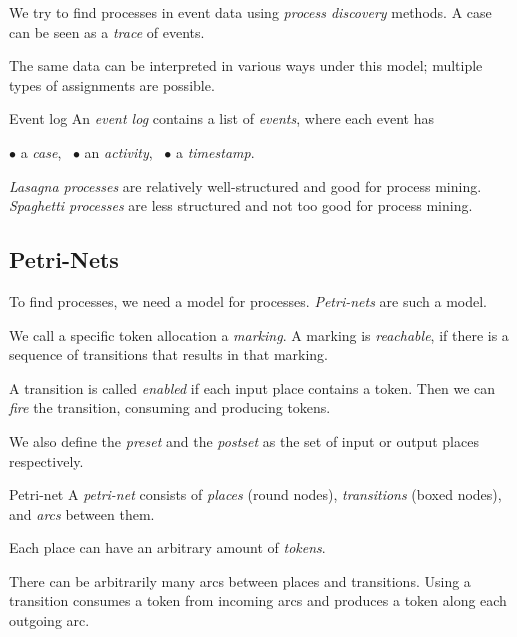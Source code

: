 \documentclass[english]{panikzettel}
\begin{document}
\begin{halfboxl}
We try to find processes in event data using \emph{process discovery} methods.
A case can be seen as a \emph{trace} of events.

The same data can be interpreted in various ways under this model; multiple types of assignments are possible.
\end{halfboxl}%
\begin{halfboxr}
\vspace{-\baselineskip}
\begin{defi}{Event log}
An \emph{event log} contains a list of \emph{events}, where each event has
\begin{tightcenter}
$\bullet$ a \emph{case},~ $\bullet$ an \emph{activity},~ $\bullet$ a \emph{timestamp}.
\end{tightcenter}
\end{defi}
\end{halfboxr}

\emph{Lasagna processes} are relatively well-structured and good for process mining.
\emph{Spaghetti processes} are less structured and not too good for process mining.

\vspace{-0.5\baselineskip}
\subsection{Petri-Nets}

\begin{halfboxl}
To find processes, we need a model for processes.
\emph{Petri-nets} are such a model.

We call a specific token allocation a \emph{marking}.
A marking is \emph{reachable}, if there is a sequence of transitions that results in that marking.

A transition is called \emph{enabled} if each input place contains a token.
Then we can \emph{fire} the transition, consuming and producing tokens.

We also define the \emph{preset} and the \emph{postset} as the set of input or output places respectively.
\end{halfboxl}%
\begin{halfboxr}
\vspace{-\baselineskip}
\begin{defi}{Petri-net}
A \emph{petri-net} consists of \emph{places} (round nodes), \emph{transitions} (boxed nodes), and \emph{arcs} between them.

Each place can have an arbitrary amount of \emph{tokens}.

There can be arbitrarily many arcs between places and transitions.
Using a transition consumes a token from incoming arcs and produces a token along each outgoing arc.
\end{defi}
\end{halfboxr}
\end{document}
